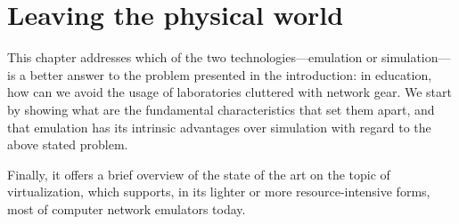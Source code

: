 
\chapter{Leaving the physical world}
\label{ch:leavingthephysicalworld}

This chapter addresses which of the two technologies---emulation or simulation---is a better answer to the problem presented in the introduction:
in education, how can we avoid the usage of laboratories cluttered with network gear.
We start by showing what are the fundamental characteristics that set them apart, and that emulation has its intrinsic advantages over simulation with regard to the above stated problem.

Finally, it offers a brief overview of the state of the art on the topic of virtualization, which supports, in its lighter or more resource-intensive forms, most of computer network emulators today.







